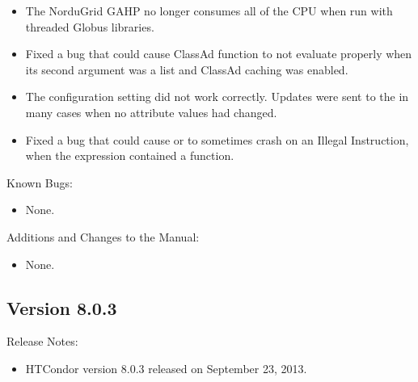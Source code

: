 \begin{itemize}
\item The NorduGrid GAHP no longer consumes all of the CPU when run
with threaded Globus libraries.

\item Fixed a bug that could cause ClassAd function  to not
evaluate properly when its second argument was a list and ClassAd caching
was enabled.

\item The configuration setting 
did not work correctly.  Updates were sent to the 
in many cases when no attribute values had changed.

\item Fixed a bug that could cause   or 
to sometimes crash on an Illegal Instruction, 
when the  expression contained a function.

\end{itemize}

\noindent Known Bugs:

\begin{itemize}

\item None.

\end{itemize}

\noindent Additions and Changes to the Manual:

\begin{itemize}

\item None.

\end{itemize}


\subsection*{\label{sec:New-8-0-3}Version 8.0.3}

\noindent Release Notes:

\begin{itemize}

\item HTCondor version 8.0.3 released on September 23, 2013.

\end{itemize}


